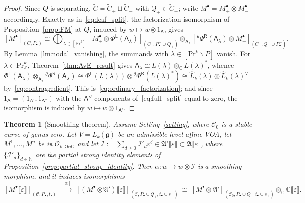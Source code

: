 \documentclass[12pt,a4paper,reqno]{amsart}
\numberwithin{equation}{section}
\newtheorem{theorem}{Theorem}[section]
\theoremstyle{definition}
\newcommand{\g}{\mathfrak{g}}
\newcommand{\C}{\mathbb{C}}
\newcommand{\N}{\mathbb{N}}
\newcommand{\Z}{\mathbb{Z}}
\newcommand{\I}{\mathscr{I}}
\newcommand{\CCC}{\mathscr{C}}
\newcommand{\lb}{\llbracket}
\newcommand{\rb}{\rrbracket}
\def\O{\mathcal{O}}
\def\Ord{\mathsf{Ord}}
\def\L{\mathsf{L}}
\def\R{\mathsf{R}}
\def\Pr{\mathrm{Pr}}
\def\la{\lambda}
\def\bs{\backslash}
\def\o{\otimes}
\def\fA{\mathfrak{A}}
\def\A{\mathsf{A}}
\begin{document}
\begin{proof}
Since $Q$ is separating, $\tilde{C}=\tilde{C}_+\sqcup\tilde{C}_-$ with $Q_\pm\in\tilde{C}_\pm$; write $M^\bullet=M_+^\bullet\o M_-^\bullet$ accordingly. Exactly as in~\eqref{eq:leaf_split}, the factorization isomorphism of Proposition~\ref{prop:FM} at $Q$, induced by $w\mapsto w\o 1_\A$, gives
\begin{equation}\label{eq:full_split}
    [M^\bullet]_{(C,P_\bullet)} \cong \bigoplus_{\la \in [\Pr^k]} [M_+^\bullet \otimes \Phi^\L(\A_\la)]_{(\tilde{C}_+,P_\bullet^+\cup Q_+)} \otimes_{\A_\la} [{}^\theta\Phi^\R(\A_\la) \otimes M_-^\bullet]_{(\tilde{C}_-,Q_- \cup P_\bullet^-)}.
\end{equation}
By Lemma~\ref{lm:nodal_vanishing}, the summands with $\la\in[\Pr^k\bs P]$ vanish. For $\la\in\Pr^k_\Z$, Theorem~\ref{thm:AvE_result} gives $\A_\la\cong L(\la)\o_\C L(\la)^\ast$, whence $\Phi^\L(\A_\la)\o_{\A_\la}{}^\theta\Phi^\R(\A_\la)\cong \Phi^\L(L(\la))\o{}^\theta\Phi^\R(L(\la)^\ast)\cong\hat{L}_k(\la)\o\hat{L}_k(\la)^\vee$ by~\eqref{eq:contragredient}. This is~\eqref{eq:ordinary_factorization}; and since $1_\A=(1_{\A'},1_{\A''})$ with the $\A''$-components of~\eqref{eq:full_split} equal to zero, the isomorphism is induced by $w\mapsto w\o 1_{\A'}$.
\end{proof}

\begin{theorem}[Smoothing theorem]\label{thm:main_smoothing}
    Assume Setting~\ref{setting}, where $\CCC_0$ is a stable curve of genus zero. Let $V = L_k(\g)$ be an admissible-level affine VOA, let $M^1,\dots, M^n$ be in $\O_{k,\Ord}$, and let $\I:=\sum_{d\geq 0}\I'_d\varepsilon^d\in\fA'\lb\varepsilon\rb\subset\fA\lb\varepsilon\rb$, where $\{\I'_d\}_{d\in\N}$ are the partial strong identity elements of Proposition~\ref{prop:partial_strong_identity}. Then $\alpha:w\mapsto w\o\I$ is a smoothing morphism, and it induces isomorphisms
    \begin{equation}\label{eq:smoothing_iso}
    [M^\bullet\lb\varepsilon\rb]_{(\CCC,P_\bullet,t_\bullet)}\ \xrightarrow{\ [\alpha]\ }\ [(M^\bullet\o\fA')\lb\varepsilon\rb]_{(\widetilde{\CCC},P_\bullet\cup Q_\pm,t_\bullet\cup s_\pm)}\ \cong\ [M^\bullet\o\fA']_{(\widetilde{\CCC}_0,P_\bullet\cup Q_\pm,t_\bullet\cup s_\pm)}\o_\C\C\lb\varepsilon\rb.
    \end{equation}
\end{theorem}
\end{document}
